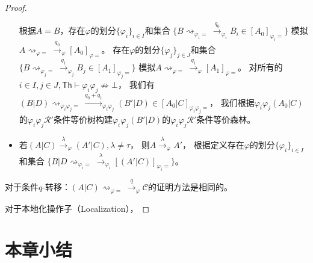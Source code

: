 \begin{proof}
\begin{itemize}
{         根据$A=B$，存在$\varphi$的划分$\{\varphi_i\}_{i\in I}$和集合
         $\{B\rightsquigarrow_{\varphi_i=}\stackrel{q_0}{\rightarrow}_{\varphi_i}B_i\in [A_0]_{\varphi_i =}\}$
         模拟$A\rightsquigarrow_{\varphi = }\stackrel{q_0}{\rightarrow}_{\varphi}[A_0]_{\varphi=}$。
         存在$\varphi$的划分$\{\varphi_j\}_{j\in J}$和集合
         $\{B\rightsquigarrow_{\varphi_j=}\stackrel{q_1}{\rightarrow}_{\varphi_j}B_j\in [A_1]_{\varphi_j =}\}$
         模拟$A\rightsquigarrow_{\varphi = }\stackrel{q_1}{\rightarrow}_{\varphi}[A_1]_{\varphi=}$。
         对所有的$i\in I, j\in J, \mathsf{Th}\vdash \varphi_i\varphi_j\not\Rightarrow \bot$，
         我们有$(B|D)\rightsquigarrow_{\varphi_i\varphi_j=}\stackrel{q_0+q_1}{\longrightarrow}_{\varphi_i\varphi_j}(B'|D)\in[A_0|C]_{\varphi_i\varphi_j=}$，
         我们根据$\varphi_i\varphi_j (A_0|C)$的$\varphi_i\varphi_j \mathcal{R}' $条件等价树构建$\varphi_i\varphi_j(B'|D)$的$\varphi_i\varphi_j \mathcal{R}' $条件等价森林。
      }
      \item {
         若$(A|C)\stackrel{\lambda}{\rightarrow}_{\varphi} (A'|C), \lambda\neq \tau$，
         则$A\stackrel{\lambda}{\rightarrow}_{\varphi} A'$，
         根据定义存在$\varphi$的划分$\{\varphi_i\}_{i\in I}$和集合
         $\{B|D\rightsquigarrow_{\varphi_i=}\stackrel{\lambda}{\rightarrow}_{\varphi_i} [(A'|C)]_{\varphi_i=}\}$。
      }
   \end{itemize}
   对于条件$q$-转移：$(A|C)\rightsquigarrow_{\varphi=}\stackrel{q}{\rightarrow}_{\varphi}\mathcal{C}$的证明方法是相同的。

   对于本地化操作子（Localization），

\end{proof}

\section{本章小结}